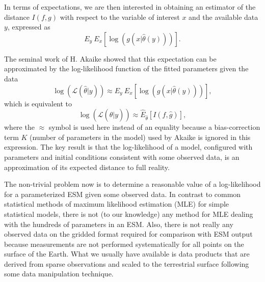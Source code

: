 \documentclass[gmd, manuscript]{copernicus}
\begin{document}
In terms of expectations, we are then interested in obtaining an estimator of the distance $I(f, g)$ with respect to the variable of interest $x$ and the available data $y$, expressed as
\begin{equation}
E_y \ E_x [\log(g(x | \hat{\theta}(y) ))].
\end{equation}

The seminal work of H. Akaike showed that this expectation can be approximated by the log-likelihood function of the fitted parameters given the data
\begin{equation}
\log (\mathcal{L}(\hat{\theta} | y) ) \approx E_y \ E_x [\log(g(x | \hat{\theta}(y) ))],
\end{equation}
which is equivalent to
\begin{equation}
\log (\mathcal{L}(\hat{\theta} | y) ) \approx \hat{E}_{\hat{\theta}} [I(f, \hat{g})],
\end{equation}
where the $\approx$ symbol is used here instead of an equality because a bias-correction term $K$ (number of parameters in the model) used by Akaike is ignored in this expression. The key result is that the log-likelihood of a model, configured with parameters and initial conditions consistent with some observed data, is an approximation of its expected distance to full reality.

The non-trivial problem now is to determine a reasonable value of a log-likelihood for a parameterized ESM given some observed data. In contrast to common statistical methods of maximum likelihood estimation (MLE) for simple statistical models, there is not (to our knowledge) any method for MLE dealing with the hundreds of parameters in an ESM. Also, there is not really any observed data on the gridded format required for comparison with ESM output because measurements are not performed systematically for all points on the surface of the Earth. What we usually have available is data products that are derived from sparse observations and scaled to the terrestrial surface following some data manipulation technique. 
\end{document}

